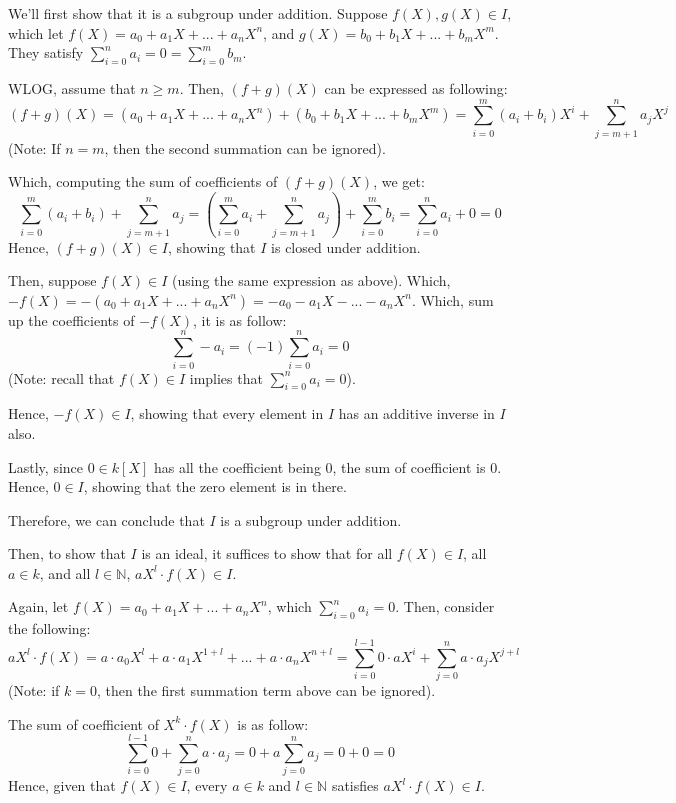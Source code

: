 \documentclass{article}
\begin{document}
We'll first show that it is a subgroup under addition. Suppose $f(X),g(X)\in I$, which let $f(X)=a_0+a_1X+...+a_nX^n$, and $g(X)=b_0+b_1X+...+b_mX^m$.
They satisfy $\sum_{i=0}^{n}a_i=0 = \sum_{i=0}^{m}b_m$.

WLOG, assume that $n\geq m$. Then, $(f+g)(X)$ can be expressed as following:
$$(f+g)(X)=(a_0+a_1X+...+a_nX^n)+(b_0+b_1X+...+b_mX^m) = \sum_{i=0}^{m}(a_i+b_i)X^i + \sum_{j=m+1}^{n}a_jX^j$$
(Note: If $n=m$, then the second summation can be ignored).

Which, computing the sum of coefficients of $(f+g)(X)$, we get:
$$\sum_{i=0}^{m}(a_i+b_i)+\sum_{j=m+1}^{n}a_j = \left(\sum_{i=0}^{m}a_i+\sum_{j=m+1}^{n}a_j\right)+\sum_{i=0}^{m}b_i = \sum_{i=0}^{n}a_i + 0 = 0$$
Hence, $(f+g)(X)\in I$, showing that $I$ is closed under addition.

\hfill

Then, suppose $f(X)\in I$ (using the same expression as above). Which, $-f(X)=-(a_0+a_1X+...+a_nX^n) = -a_0-a_1X-...-a_nX^n$.
Which, sum up the coefficients of $-f(X)$, it is as follow:
$$\sum_{i=0}^{n}-a_i = (-1)\sum_{i=0}^{n}a_i = 0$$
(Note: recall that $f(X)\in I$ implies that $\sum_{i=0}^{n}a_i = 0$).

Hence, $-f(X)\in I$, showing that every element in $I$ has an additive inverse in $I$ also.

\hfill

Lastly, since $0\in k[X]$ has all the coefficient being $0$, the sum of coefficient is $0$. Hence, $0\in I$, showing that the zero element is in there.

Therefore, we can conclude that $I$ is a subgroup under addition.

\hfill

\hfill

Then, to show that $I$ is an ideal, it suffices to show that for all $f(X)\in I$, all $a\in k$, and all $l\in\mathbb{N}$, $aX^l\cdot f(X)\in I$.

Again, let $f(X)=a_0+a_1X+...+a_nX^n$, which $\sum_{i=0}^{n}a_i=0$. Then, consider the following: 
$$aX^l\cdot f(X)= a\cdot a_0X^l+a\cdot a_1X^{1+l}+...+a\cdot a_nX^{n+l} = \sum_{i=0}^{l-1}0\cdot aX^i + \sum_{j=0}^{n}a\cdot a_jX^{j+l}$$
(Note: if $k=0$, then the first summation term above can be ignored).

The sum of coefficient of $X^k\cdot f(X)$ is as follow:
$$\sum_{i=0}^{l-1}0 + \sum_{j=0}^{n}a\cdot a_j = 0+a\sum_{j=0}^{n}a_j=0+0=0$$
Hence, given that $f(X)\in I$, every $a\in k$ and $l\in\mathbb{N}$ satisfies $aX^l\cdot f(X)\in I$.
\end{document}
